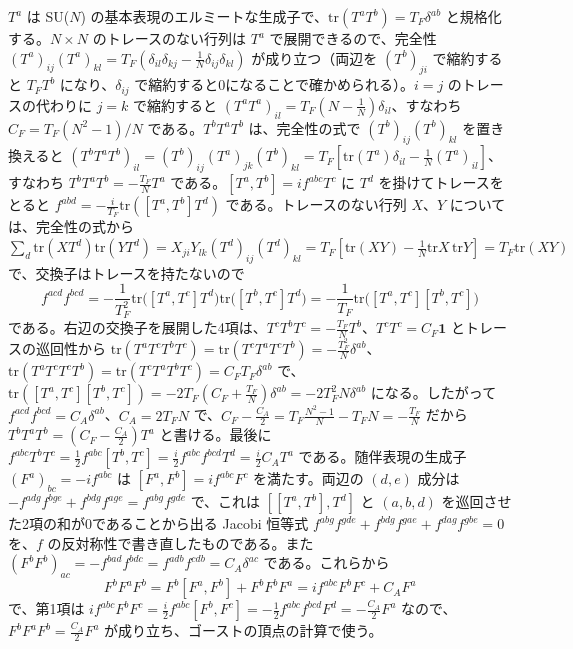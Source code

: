 \documentclass[a4paper,10pt]{ltjsarticle}
\newcommand{\tr}{\mathrm{tr}}
\begin{document}
$T^a$ は SU($N$) の基本表現のエルミートな生成子で、$\tr(T^aT^b)=T_F\delta^{ab}$ と規格化する。$N\times N$ のトレースのない行列は $T^a$ で展開できるので、完全性 $(T^a)_{ij}(T^a)_{kl}=T_F(\delta_{il}\delta_{kj}-\frac1N\delta_{ij}\delta_{kl})$ が成り立つ（両辺を $(T^b)_{ji}$ で縮約すると $T_FT^b$ になり、$\delta_{ij}$ で縮約すると0になることで確かめられる）。$i=j$ のトレースの代わりに $j=k$ で縮約すると $(T^aT^a)_{il}=T_F(N-\frac1N)\delta_{il}$、すなわち $C_F=T_F(N^2-1)/N$ である。$T^bT^aT^b$ は、完全性の式で $(T^b)_{ij}(T^b)_{kl}$ を置き換えると $(T^bT^aT^b)_{il}=(T^b)_{ij}(T^a)_{jk}(T^b)_{kl}=T_F[\tr(T^a)\delta_{il}-\frac1N(T^a)_{il}]$、すなわち $T^bT^aT^b=-\frac{T_F}NT^a$ である。$[T^a,T^b]=if^{abc}T^c$ に $T^d$ を掛けてトレースをとると $f^{abd}=-\frac{i}{T_F}\tr([T^a,T^b]T^d)$ である。トレースのない行列 $X$、$Y$ については、完全性の式から $\sum_d\tr(XT^d)\tr(YT^d)=X_{ji}Y_{lk}(T^d)_{ij}(T^d)_{kl}=T_F[\tr(XY)-\frac1N\tr X\,\tr Y]=T_F\tr(XY)$ で、交換子はトレースを持たないので
\begin{equation*}
f^{acd}f^{bcd}=-\frac{1}{T_F^2}\tr\bigl([T^a,T^c]T^d\bigr)\tr\bigl([T^b,T^c]T^d\bigr)=-\frac1{T_F}\tr\bigl([T^a,T^c][T^b,T^c]\bigr)
\end{equation*}
である。右辺の交換子を展開した4項は、$T^cT^bT^c=-\frac{T_F}NT^b$、$T^cT^c=C_F\mathbf 1$ とトレースの巡回性から $\tr(T^aT^cT^bT^c)=\tr(T^cT^aT^cT^b)=-\frac{T_F^2}N\delta^{ab}$、$\tr(T^aT^cT^cT^b)=\tr(T^cT^aT^bT^c)=C_FT_F\delta^{ab}$ で、$\tr([T^a,T^c][T^b,T^c])=-2T_F(C_F+\frac{T_F}N)\delta^{ab}=-2T_F^2N\delta^{ab}$ になる。したがって $f^{acd}f^{bcd}=C_A\delta^{ab}$、$C_A=2T_FN$ で、$C_F-\frac{C_A}2=T_F\frac{N^2-1}N-T_FN=-\frac{T_F}N$ だから $T^bT^aT^b=(C_F-\frac{C_A}2)T^a$ と書ける。最後に $f^{abc}T^bT^c=\frac12f^{abc}[T^b,T^c]=\frac i2f^{abc}f^{bcd}T^d=\frac i2C_AT^a$ である。随伴表現の生成子 $(F^a)_{bc}=-if^{abc}$ は $[F^a,F^b]=if^{abc}F^c$ を満たす。両辺の $(d,e)$ 成分は $-f^{adg}f^{bge}+f^{bdg}f^{age}=f^{abg}f^{gde}$ で、これは $[[T^a,T^b],T^d]$ と $(a,b,d)$ を巡回させた2項の和が0であることから出る Jacobi 恒等式 $f^{abg}f^{gde}+f^{bdg}f^{gae}+f^{dag}f^{gbe}=0$ を、$f$ の反対称性で書き直したものである。また $(F^bF^b)_{ac}=-f^{bad}f^{bdc}=f^{adb}f^{cdb}=C_A\delta^{ac}$ である。これらから
\begin{equation*}
F^bF^aF^b=F^b[F^a,F^b]+F^bF^bF^a=if^{abc}F^bF^c+C_AF^a
\end{equation*}
で、第1項は $if^{abc}F^bF^c=\frac i2f^{abc}[F^b,F^c]=-\frac12f^{abc}f^{bcd}F^d=-\frac{C_A}2F^a$ なので、$F^bF^aF^b=\frac{C_A}2F^a$ が成り立ち、ゴーストの頂点の計算で使う。
\end{document}
